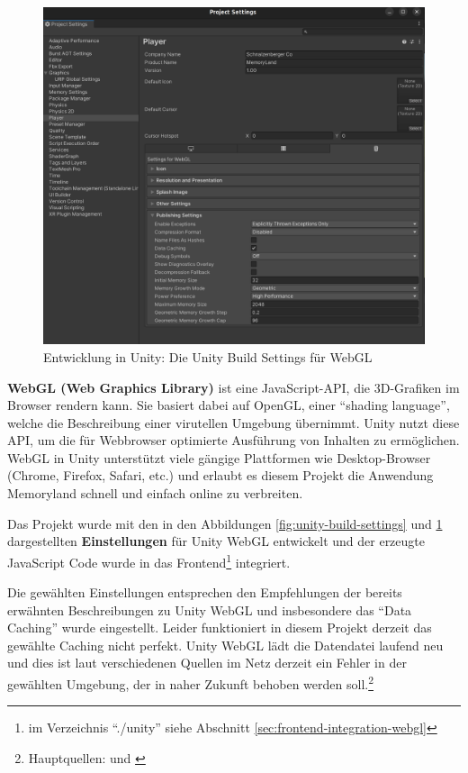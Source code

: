 \begin{figure}
    \centering
    \includegraphics[scale=0.09]{pics/unity-build-webgl-settings.png}
    \caption{Entwicklung in Unity: Die Unity Build Settings für WebGL}
    \label{fig:unity-build-webgl-settings}
\end{figure}



\textbf{WebGL (Web Graphics Library)} ist eine JavaScript-API, die 3D-Grafiken im Browser rendern kann. Sie basiert dabei auf OpenGL, einer ``shading language'', welche die Beschreibung einer virutellen Umgebung übernimmt. Unity nutzt diese API, um die für Webbrowser optimierte Ausführung von Inhalten zu ermöglichen. WebGL in Unity unterstützt viele gängige Plattformen wie Desktop-Browser (Chrome, Firefox, Safari, etc.) und erlaubt es diesem Projekt die Anwendung Memoryland schnell und einfach online zu verbreiten.


Das Projekt wurde mit den in den Abbildungen \ref{fig:unity-build-settings} und \ref{fig:unity-build-webgl-settings} dargestellten \textbf{Einstellungen} für Unity WebGL entwickelt und der erzeugte JavaScript Code wurde in das Frontend\footnote{im Verzeichnis ``./unity'' siehe Abschnitt \ref{sec:frontend-integration-webgl}} integriert.


Die gewählten Einstellungen entsprechen den Empfehlungen der bereits erwähnten Beschreibungen zu Unity WebGL und insbesondere das ``Data Caching'' wurde eingestellt. Leider funktioniert in diesem Projekt derzeit das gewählte Caching nicht perfekt. Unity WebGL lädt die Datendatei laufend neu und dies ist laut verschiedenen Quellen im Netz derzeit ein Fehler in der gewählten Umgebung, der in naher Zukunft behoben werden soll.\footnote{Hauptquellen: \cite{UnityDocsDataCachingIssue} und \cite{UnityDocsDataCachingIssue2}}


